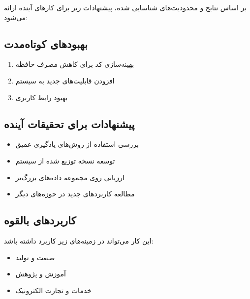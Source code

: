 بر اساس نتایج و محدودیت‌های شناسایی شده، پیشنهادات زیر برای کارهای آینده ارائه می‌شود:

\subsection{بهبودهای کوتاه‌مدت}
\begin{enumerate}
    \item بهینه‌سازی کد برای کاهش مصرف حافظه
    \item افزودن قابلیت‌های جدید به سیستم
    \item بهبود رابط کاربری
\end{enumerate}

\subsection{پیشنهادات برای تحقیقات آینده}
\begin{itemize}
    \item بررسی استفاده از روش‌های یادگیری عمیق
    \item توسعه نسخه توزیع شده از سیستم
    \item ارزیابی روی مجموعه داده‌های بزرگ‌تر
    \item مطالعه کاربردهای جدید در حوزه‌های دیگر
\end{itemize}

\subsection{کاربردهای بالقوه}
این کار می‌تواند در زمینه‌های زیر کاربرد داشته باشد:
\begin{itemize}
    \item صنعت و تولید
    \item آموزش و پژوهش
    \item خدمات و تجارت الکترونیک
\end{itemize}

